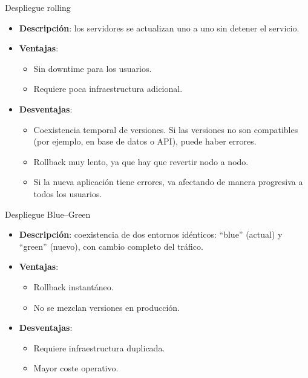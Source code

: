 \documentclass{beamer}
\begin{document}
\begin{frame}{Despliegue rolling}
\begin{itemize}
    \item \textbf{Descripción}: los servidores se actualizan uno a uno sin detener el servicio.
    \item \textbf{Ventajas}:
    \begin{itemize}
        \item Sin downtime para los usuarios.
        \item Requiere poca infraestructura adicional.
    \end{itemize}
    \item \textbf{Desventajas}:
    \begin{itemize}
        \item Coexistencia temporal de versiones. Si las versiones no son compatibles (por ejemplo, en base de datos o API), puede haber errores.
        \item Rollback muy lento, ya que hay que revertir nodo a nodo.
        \item Si la nueva aplicación tiene errores, va afectando de manera progresiva a todos los usuarios.
    \end{itemize}
\end{itemize}
\end{frame}

\begin{frame}{Despliegue Blue--Green}
\begin{itemize}
    \item \textbf{Descripción}: coexistencia de dos entornos idénticos: ``blue'' (actual) y ``green'' (nuevo), con cambio completo del tráfico.
    \item \textbf{Ventajas}:
    \begin{itemize}
        \item Rollback instantáneo.
        \item No se mezclan versiones en producción.
    \end{itemize}
    \item \textbf{Desventajas}:
    \begin{itemize}
        \item Requiere infraestructura duplicada.
        \item Mayor coste operativo.
    \end{itemize}
\end{itemize}
\end{frame}
\end{document}
